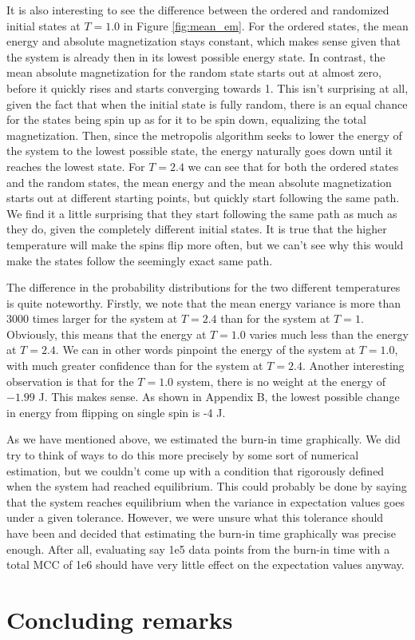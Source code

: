 \documentclass{article}
\begin{document}
\begin{multicols}{2}
It is also interesting to see the difference between the ordered and randomized initial states at $T=1.0$ in Figure \ref{fig:mean_em}. For the ordered states, the mean energy and absolute magnetization stays constant, which makes sense given that the system is already then in its lowest possible energy state. In contrast, the mean absolute magnetization for the random state starts out at almost zero, before it quickly rises and starts converging towards 1. This isn't surprising at all, given the fact that when the initial state is fully random, there is an equal chance for the states being spin up as for it to be spin down, equalizing the total magnetization. Then, since the metropolis algorithm seeks to lower the energy of the system to the lowest possible state, the energy naturally goes down until it reaches the lowest state. For $T=2.4$ we can see that for both the ordered states and the random states, the mean energy and the mean absolute magnetization starts out at different starting points, but quickly start following the same path. We find it a little surprising that they start following the same path as much as they do, given the completely different initial states. It is true that the higher temperature will make the spins flip more often, but we can't see why this would make the states follow the seemingly exact same path. 

The difference in the probability distributions for the two different temperatures is quite noteworthy. Firstly, we note that the mean energy variance is more than 3000 times larger for the system at $T=2.4$ than for the system at $T=1$. Obviously, this means that the energy at $T=1.0$ varies much less than the energy at $T=2.4$. We can in other words pinpoint the energy of the system at $T=1.0$, with much greater confidence than for the system at $T=2.4$. Another interesting observation is that for the $T=1.0$ system, there is no weight at the energy of $-1.99$ J. This makes sense. As shown in Appendix B, the lowest possible change in energy from flipping on single spin is -4 J. 

As we have mentioned above, we estimated the burn-in time graphically. We did try to think of ways to do this more precisely by some sort of numerical estimation, but we couldn't come up with a condition that rigorously defined when the system had reached equilibrium. This could probably be done by saying that the system reaches equilibrium when the variance in expectation values goes under a given tolerance. However, we were unsure what this tolerance should have been and decided that estimating the burn-in time graphically was precise enough. After all, evaluating say 1e5 data points from the burn-in time with a total MCC of 1e6 should have very little effect on the expectation values anyway.

\section{Concluding remarks}

\end{multicols}
\end{document}
